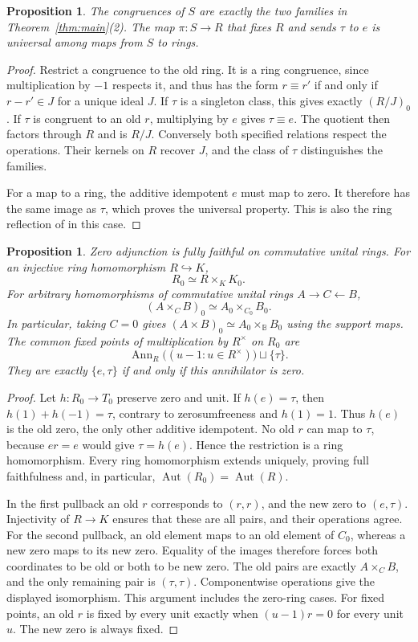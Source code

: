 \documentclass[11pt]{amsart}
\newcommand{\B}{\mathbb B}
\DeclareMathOperator{\Ann}{Ann}
\newtheorem{proposition}[theorem]{Proposition}
\theoremstyle{definition}
\theoremstyle{remark}
\begin{document}
\begin{proposition}\label{prop:congruences}
The congruences of $S$ are exactly the two families in Theorem~\ref{thm:main}(2). The map $\pi:S\to R$ that fixes $R$ and sends $\tau$ to $e$ is universal among maps from $S$ to rings.
\end{proposition}
\begin{proof}
Restrict a congruence to the old ring. It is a ring congruence, since multiplication by $-1$ respects it, and thus has the form $r\equiv r'$ if and only if $r-r'\in J$ for a unique ideal $J$. If $\tau$ is a singleton class, this gives exactly $(R/J)_0$. If $\tau$ is congruent to an old $r$, multiplying by $e$ gives $\tau\equiv e$. The quotient then factors through $R$ and is $R/J$. Conversely both specified relations respect the operations. Their kernels on $R$ recover $J$, and the class of $\tau$ distinguishes the families.

For a map to a ring, the additive idempotent $e$ must map to zero. It therefore has the same image as $\tau$, which proves the universal property. This is also the ring reflection of \cite[Proposition~4.13]{FGJM} in this case.
\end{proof}

\begin{proposition}\label{prop:functor}
Zero adjunction is fully faithful on commutative unital rings. For an injective ring homomorphism $R\hookrightarrow K$,
\[
 R_0\simeq R\times_K K_0.
\]
For arbitrary homomorphisms of commutative unital rings $A\to C\leftarrow B$,
\[
 (A\times_C B)_0\simeq A_0\times_{C_0}B_0.
\]
In particular, taking $C=0$ gives $(A\times B)_0\simeq A_0\times_{\B}B_0$ using the support maps.
The common fixed points of multiplication by $R^\times$ on $R_0$ are
\[
 \Ann_R\bigl((u-1:u\in R^\times)\bigr)\sqcup\{\tau\}.
\]
They are exactly $\{e,\tau\}$ if and only if this annihilator is zero.
\end{proposition}
\begin{proof}
Let $h:R_0\to T_0$ preserve zero and unit. If $h(e)=\tau$, then $h(1)+h(-1)=\tau$, contrary to zerosumfreeness and $h(1)=1$. Thus $h(e)$ is the old zero, the only other additive idempotent. No old $r$ can map to $\tau$, because $er=e$ would give $\tau=h(e)$. Hence the restriction is a ring homomorphism. Every ring homomorphism extends uniquely, proving full faithfulness and, in particular, $\operatorname{Aut}(R_0)=\operatorname{Aut}(R)$.

In the first pullback an old $r$ corresponds to $(r,r)$, and the new zero to $(e,\tau)$. Injectivity of $R\to K$ ensures that these are all pairs, and their operations agree. For the second pullback, an old element maps to an old element of $C_0$, whereas a new zero maps to its new zero. Equality of the images therefore forces both coordinates to be old or both to be new zero. The old pairs are exactly $A\times_C B$, and the only remaining pair is $(\tau,\tau)$. Componentwise operations give the displayed isomorphism. This argument includes the zero-ring cases. For fixed points, an old $r$ is fixed by every unit exactly when $(u-1)r=0$ for every unit $u$. The new zero is always fixed.
\end{proof}
\end{document}

